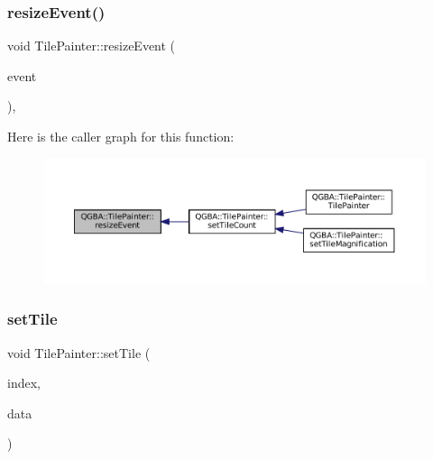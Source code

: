 \mbox{\label{class_q_g_b_a_1_1_tile_painter_a0f83eae376a1319ddee3303431381651}} 
\subsubsection{\texorpdfstring{resize\+Event()}{resizeEvent()}}
{\footnotesize\ttfamily void Tile\+Painter\+::resize\+Event (\begin{DoxyParamCaption}\item[{Q\+Resize\+Event $\ast$}]{event }\end{DoxyParamCaption})\hspace{0.3cm}{\ttfamily [override]}, {\ttfamily [protected]}}

Here is the caller graph for this function\+:
\nopagebreak
\begin{figure}[H]
\begin{center}
\leavevmode
\includegraphics[width=350pt]{class_q_g_b_a_1_1_tile_painter_a0f83eae376a1319ddee3303431381651_icgraph}
\end{center}
\end{figure}
\mbox{\label{class_q_g_b_a_1_1_tile_painter_ac529402c18637da29475a953d28b5d8f}} 
\subsubsection{\texorpdfstring{set\+Tile}{setTile}}
{\footnotesize\ttfamily void Tile\+Painter\+::set\+Tile (\begin{DoxyParamCaption}\item[{\mbox{\hyperlink{ioapi_8h_a787fa3cf048117ba7123753c1e74fcd6}{int}}}]{index,  }\item[{const color\+\_\+t $\ast$}]{data }\end{DoxyParamCaption})\hspace{0.3cm}{\ttfamily [slot]}}

